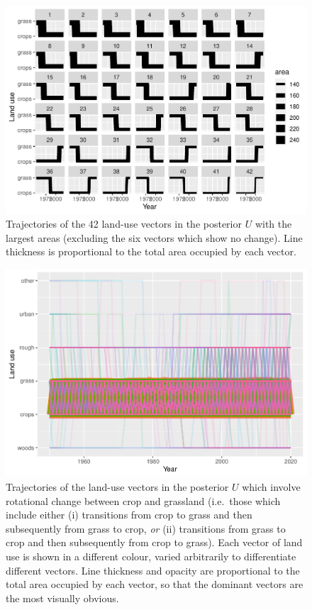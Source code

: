 \documentclass[
]{book}
\begin{document}
\begin{figure}
\centering
\includegraphics{Results_en_files/figure-latex/plotv2-1.pdf}
\caption{\label{fig:plotv2}Trajectories of the 42 land-use vectors in the posterior \(U\) with the largest areas (excluding the six vectors which show no change). Line thickness is proportional to the total area occupied by each vector.}
\end{figure}

\begin{figure}
\centering
\includegraphics{Results_en_files/figure-latex/plotcgr-1.pdf}
\caption{\label{fig:plotcgr}Trajectories of the land-use vectors in the posterior \(U\) which involve rotational change between crop and grassland (i.e.~those which include either (i) transitions from crop to grass and then subsequently from grass to crop, \emph{or} (ii) transitions from grass to crop and then subsequently from crop to grass). Each vector of land use is shown in a different colour, varied arbitrarily to differentiate different vectors. Line thickness and opacity are proportional to the total area occupied by each vector, so that the dominant vectors are the most visually obvious.}
\end{figure}
\end{document}
